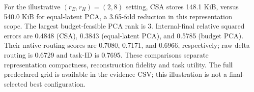 For the illustrative $(r_E,r_H)=(2,8)$ setting, CSA stores 148.1 KiB, versus 540.0 KiB for equal-latent PCA, a 3.65-fold reduction in this representation scope. The largest budget-feasible PCA rank is 3. Internal-final relative squared errors are 0.4848 (CSA), 0.3843 (equal-latent PCA), and 0.5785 (budget PCA). Their native routing scores are 0.7080, 0.7171, and 0.6966, respectively; raw-delta routing is 0.6729 and task-ID is 0.7695. These comparisons separate representation compactness, reconstruction fidelity and task utility. The full predeclared grid is available in the evidence CSV; this illustration is not a final-selected best configuration.
